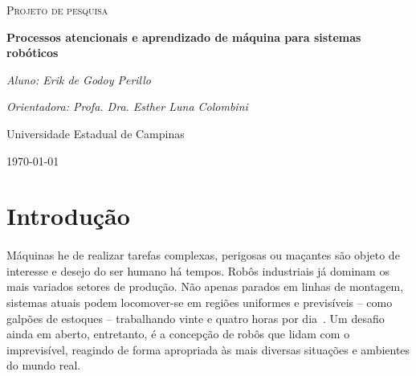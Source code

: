 \documentclass[11pt]{article}
\begin{document}
\begin{titlepage}
	\centering
	{\scshape\Large Projeto de pesquisa\par}
	\vspace{1.5cm}
	{\huge\bfseries Processos atencionais e aprendizado de máquina 
		para sistemas robóticos\par}
	\vspace{1cm}
	{\itshape Aluno: Erik de Godoy Perillo\par}
	{\itshape Orientadora: Profa. Dra. Esther Luna Colombini\par}
	\vspace{0.5cm}
	\begin{abstract}
		Entender o ambiente ao seu redor é uma tarefa fundamental para 
		o desafio de se obter máquinas autônomas que interagem com o 
		mundo de forma semelhante à nossa.
		No entanto, a alta dimensionalidade dos dados captados por sensores 
		usados para este fim é em geral problemática, muitas vezes havendo
		redundância e irrelevância de informação. 
		Nos seres humanos este filtro sensorial é realizado pela Atenção.
		Neste contexto, este projeto propõe a aplicação de técnicas de 
		aprendizado de máquina sobre informações sensoriais previamente 
		processadas por processos atencionais em uma tarefa de navegação 
		autônoma.  
		Adicionalmente, planeja-se implementar uma estrutura que permita o 
		uso das técnicas propostas para projetos robóticos em geral que 
		utilizem GPUs embarcadas.
	\end{abstract}
	\vfill
	Universidade Estadual de Campinas 
	\vfill
	{\large \today\par}
\end{titlepage}

\newpage

\section{Introdução}
\paragraph{}
Máquinas he de realizar tarefas complexas, perigosas ou maçantes são
objeto de interesse e desejo do ser humano há tempos. 
Robôs industriais já dominam os mais variados setores de produção. 
Não apenas parados em linhas de montagem, sistemas atuais podem locomover-se
em regiões uniformes e previsíveis -- como galpões de estoques -- trabalhando
vinte e quatro horas por dia~\cite{warehouse}.
Um desafio ainda em aberto, entretanto, é a concepção de robôs que lidam com 
o imprevisível, reagindo de forma apropriada às mais diversas situações 
e ambientes do mundo real. 
\end{document}
